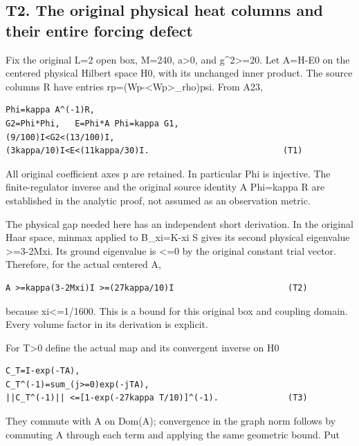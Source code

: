 \documentclass[11pt,a4paper]{article}
\renewcommand{\[}{\begingroup\small\originaldisplaystart}
\renewcommand{\]}{\originaldisplayend\endgroup}
\begin{document}
\subsection{T2. The original physical heat columns and their entire
forcing
defect}\label{t2.-the-original-physical-heat-columns-and-their-entire-forcing-defect}

Fix the original L=2 open box, M=240, a\textgreater0, and
g\^{}2\textgreater=20. Let A=H-E0 on the centered physical Hilbert space
H0, with its unchanged inner product. The source columns R have entries
{r\allowbreak{}p\allowbreak{}=\allowbreak{}(\allowbreak{}W\allowbreak{}p\allowbreak{}-\allowbreak{}\textless{}\allowbreak{}W\allowbreak{}p\allowbreak{}\textgreater{}\allowbreak{}\_\allowbreak{}r\allowbreak{}h\allowbreak{}o\allowbreak{})\allowbreak{}p\allowbreak{}s\allowbreak{}i\allowbreak{}.\allowbreak{}}
From A23,

\begin{verbatim}
Phi=kappa A^(-1)R,
G2=Phi*Phi,   E=Phi*A Phi=kappa G1,
(9/100)I<G2<(13/100)I,
(3kappa/10)I<E<(11kappa/30)I.                           (T1)
\end{verbatim}

All original coefficient axes p are retained. In particular Phi is
injective. The finite-regulator inverse and the original source identity
A Phi=kappa R are established in the analytic proof, not assumed as an
observation metric.

The physical gap needed here has an independent short derivation. In the
original Haar space, minmax applied to B\_xi=K-xi S gives its second
physical eigenvalue \textgreater=3-2Mxi. Its ground eigenvalue is
\textless=0 by the original constant trial vector. Therefore, for the
actual centered A,

\begin{verbatim}
A >=kappa(3-2Mxi)I >=(27kappa/10)I                       (T2)
\end{verbatim}

because xi\textless=1/1600. This is a bound for this original box and
coupling domain. Every volume factor in its derivation is explicit.

For T\textgreater0 define the actual map and its convergent inverse on
H0

\begin{verbatim}
C_T=I-exp(-TA),
C_T^(-1)=sum_(j>=0)exp(-jTA),
||C_T^(-1)|| <=[1-exp(-27kappa T/10)]^(-1).              (T3)
\end{verbatim}

They commute with A on Dom(A); convergence in the graph norm follows by
commuting A through each term and applying the same geometric bound. Put
\end{document}
